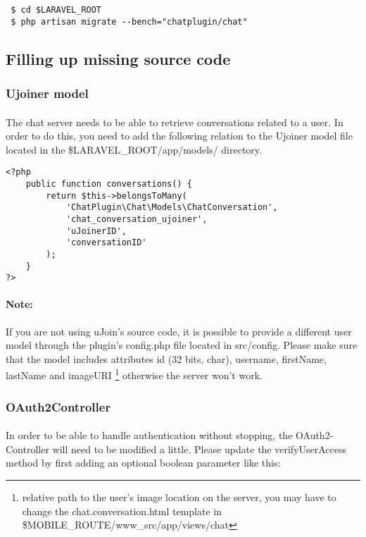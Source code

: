 \begin{verbatim}
 $ cd $LARAVEL_ROOT
 $ php artisan migrate --bench="chatplugin/chat"
\end{verbatim}

\subsection{Filling up missing source code}

\subsubsection{Ujoiner model}

\paragraph{} The chat server needs to be able to retrieve conversations related 
to a user. In order to do this, you need to add the following relation to the 
Ujoiner model file located in the \$LARAVEL\_ROOT/app/models/ directory.


\begin{verbatim}
<?php
    public function conversations() {
        return $this->belongsToMany(
            'ChatPlugin\Chat\Models\ChatConversation', 
            'chat_conversation_ujoiner',
            'uJoinerID',
            'conversationID'
        );
    }
?>
\end{verbatim}

\paragraph{Note:} If you are not using uJoin's source code, it is possible to 
provide a different user model through the plugin's config.php file located in 
src/config. Please make sure that the model includes attributes id (32 bits, 
char), username, firstName, lastName and imageURI \footnote{relative path to 
the user's image location on the server, you may have to change the 
chat.conversation.html template in \$MOBILE\_ROUTE/www\_src/app/views/chat} 
otherwise the server won't work.

\subsubsection{OAuth2Controller}

\paragraph{} In order to be able to handle authentication without stopping, the 
OAuth2-Controller will need to be modified a little. Please update the 
verifyUserAccess method by first adding an optional boolean parameter like this:

